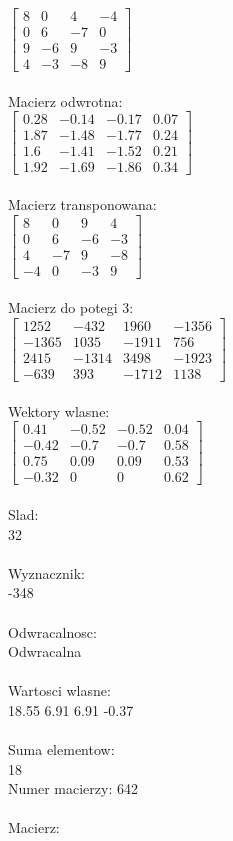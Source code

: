 \documentclass[a4paper,12pt]{article}
\begin{document}
$\begin{bmatrix} 8&0&4&-4\\0&6&-7&0\\9&-6&9&-3\\4&-3&-8&9 \end{bmatrix}$
\\
\\
Macierz odwrotna:\\

$\begin{bmatrix} 0.28&-0.14&-0.17&0.07\\1.87&-1.48&-1.77&0.24\\1.6&-1.41&-1.52&0.21\\1.92&-1.69&-1.86&0.34 \end{bmatrix}$
\\
\\
Macierz transponowana:\\

$\begin{bmatrix} 8&0&9&4\\0&6&-6&-3\\4&-7&9&-8\\-4&0&-3&9 \end{bmatrix}$
\\
\\
Macierz do potegi 3:\\

$\begin{bmatrix} 1252&-432&1960&-1356\\-1365&1035&-1911&756\\2415&-1314&3498&-1923\\-639&393&-1712&1138 \end{bmatrix}$
\\
\\
Wektory wlasne:\\

$\begin{bmatrix} 0.41&-0.52&-0.52&0.04\\-0.42&-0.7&-0.7&0.58\\0.75&0.09&0.09&0.53\\-0.32&0&0&0.62 \end{bmatrix}$
\\
\\
Slad:\\
32
\\
\\
Wyznacznik:\\
-348
\\
\\
Odwracalnosc:\\
Odwracalna
\\
\\
Wartosci wlasne:\\
18.55 6.91 6.91 -0.37
\\
\\
Suma elementow:\\
18
\\
\newpage
Numer macierzy:
642
\\
\\
Macierz:\\
\end{document}
